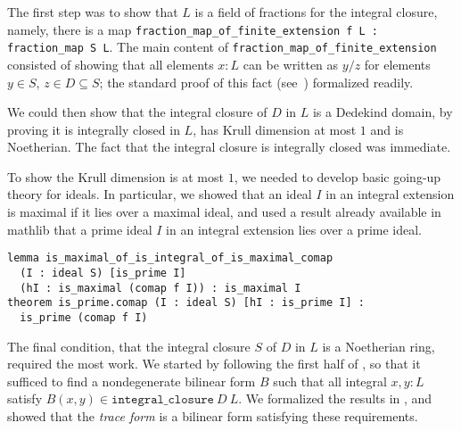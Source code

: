 \documentclass[a4paper,USenglish,cleveref, autoref, thm-restate]{lipics-v2021}
\newcommand{\lean}[1]{\texttt{#1}\xspace} %
\newcommand{\mathlib}{\textsf{mathlib}\xspace}
\begin{document}
The first step was to show that $L$ is a field of fractions for the integral closure, namely, there is a map \lean{fraction\_map\_of\_finite\_extension f L : fraction\_map S L}.
The main content of \lean{fraction\_map\_of\_finite\_extension} consisted of showing that all elements $x : L$ can be written as $y / z$ for elements $y \in S$, $z \in D \subseteq S$;
the standard proof of this fact (see~\cite[Theorem~15.29]{Dummit-and-Foote}) formalized readily.

We could then show that the integral closure of $D$ in $L$ is a Dedekind domain,
by proving it is integrally closed in $L$, has Krull dimension at most $1$ and is Noetherian.
The fact that the integral closure is integrally closed was immediate.

To show the Krull dimension is at most $1$, we needed to develop basic going-up theory for ideals.
In particular, we showed that an ideal $I$ in an integral extension is maximal if it lies over a maximal ideal,
and used a result already available in \mathlib that a prime ideal $I$ in an integral extension lies over a prime ideal.
\begin{lstlisting}
lemma is_maximal_of_is_integral_of_is_maximal_comap
  (I : ideal S) [is_prime I]
  (hI : is_maximal (comap f I)) : is_maximal I
theorem is_prime.comap (I : ideal S) [hI : is_prime I] :
  is_prime (comap f I)
\end{lstlisting}

The final condition, that the integral closure $S$ of $D$ in $L$ is a Noetherian ring, required the most work.
We started by following the first half of \cite[Theorem~15.29]{Dummit-and-Foote},
so that it sufficed to find a nondegenerate bilinear form $B$ such that all integral $x, y : L$ satisfy $B(x, y) \in \lean{integral\_closure}\ D\ L$.
We formalized the results in \cite[\S\S~2.5--2.8]{Neukirch}, and showed that the \emph{trace form} is a bilinear form satisfying these requirements.
\end{document}
